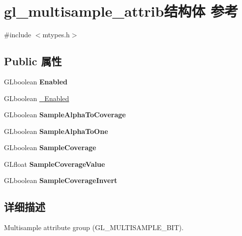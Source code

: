 \hypertarget{structgl__multisample__attrib}{}\section{gl\+\_\+multisample\+\_\+attrib结构体 参考}
\label{structgl__multisample__attrib}


{\ttfamily \#include $<$mtypes.\+h$>$}

\subsection*{Public 属性}
\begin{DoxyCompactItemize}
\item 
\mbox{\label{structgl__multisample__attrib_a393138ae0d9ab18bbb674d7cd61b0aeb}} 
G\+Lboolean {\bfseries Enabled}
\item 
G\+Lboolean \hyperlink{structgl__multisample__attrib_a68ee7b2141cb4e6c18eefe01bc04026c}{\+\_\+\+Enabled}
\item 
\mbox{\label{structgl__multisample__attrib_a71f1bde73196f60f50cd4f6dac749fd7}} 
G\+Lboolean {\bfseries Sample\+Alpha\+To\+Coverage}
\item 
\mbox{\label{structgl__multisample__attrib_a0057e93e53864bb4df1517b88f6e2ab6}} 
G\+Lboolean {\bfseries Sample\+Alpha\+To\+One}
\item 
\mbox{\label{structgl__multisample__attrib_a710a34768e630a5d1562f0dd5afa8073}} 
G\+Lboolean {\bfseries Sample\+Coverage}
\item 
\mbox{\label{structgl__multisample__attrib_a84f73296f5481bfadf1b4c5908b620ba}} 
G\+Lfloat {\bfseries Sample\+Coverage\+Value}
\item 
\mbox{\label{structgl__multisample__attrib_a8558d6dec82560e3e782cb65323943ab}} 
G\+Lboolean {\bfseries Sample\+Coverage\+Invert}
\end{DoxyCompactItemize}


\subsection{详细描述}
Multisample attribute group (G\+L\+\_\+\+M\+U\+L\+T\+I\+S\+A\+M\+P\+L\+E\+\_\+\+B\+IT). 


